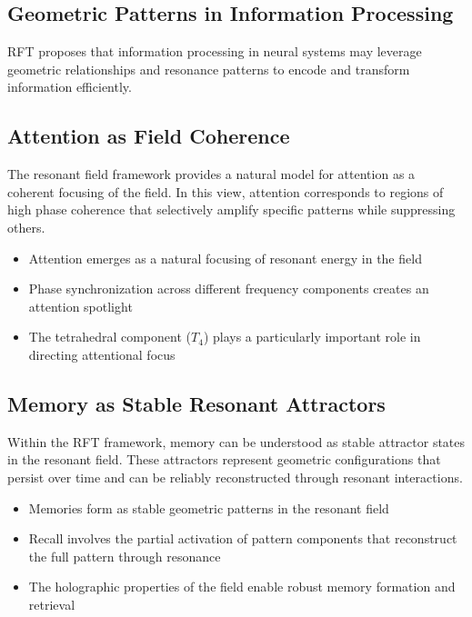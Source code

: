 \documentclass[12pt,letterpaper]{article}
\begin{document}
\vspace{2mm}
\subsection{Geometric Patterns in Information Processing}
\label{subsec:geometric_patterns}

RFT proposes that information processing in neural systems may leverage geometric relationships and resonance patterns to encode and transform information efficiently.

\subsection{Attention as Field Coherence}
\label{subsec:attention}

The resonant field framework provides a natural model for attention as a coherent focusing of the field. In this view, attention corresponds to regions of high phase coherence that selectively amplify specific patterns while suppressing others.

\begin{itemize}
    \item Attention emerges as a natural focusing of resonant energy in the field
    \item Phase synchronization across different frequency components creates an attention spotlight
    \item The tetrahedral component ($T_4$) plays a particularly important role in directing attentional focus
\end{itemize}

\subsection{Memory as Stable Resonant Attractors}
\label{subsec:memory}

Within the RFT framework, memory can be understood as stable attractor states in the resonant field. These attractors represent geometric configurations that persist over time and can be reliably reconstructed through resonant interactions.

\begin{itemize}
    \item Memories form as stable geometric patterns in the resonant field
    \item Recall involves the partial activation of pattern components that reconstruct the full pattern through resonance
    \item The holographic properties of the field enable robust memory formation and retrieval
\end{itemize}
\end{document}
